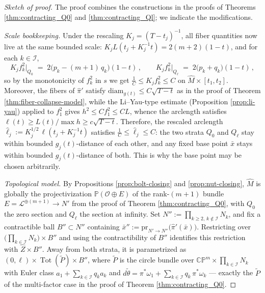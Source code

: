 \documentclass[11pt]{amsart}
\theoremstyle{plain}
\numberwithin{equation}{section}
\theoremstyle{definition}
\theoremstyle{remark}
\begin{document}
\begin{proof}[Sketch of proof]
The proof combines the constructions in the proofs of Theorems \ref{thm:contracting_Q0} and \ref{thm:contracting_Ql}; we indicate the modifications.

\emph{Scale bookkeeping.} Under the rescaling $K_j = (T-t_j)^{-1}$, all fiber quantities now live at the same bounded scale: $K_jL(t_j + K_j^{-1}t) = 2(m+2)(1-t)$, and for each $k \in \mathcal{I}$,
\[K_jf_k^2\big|_{Q_0} \;=\; 2\big(p_k - (m+1)\,q_k\big)(1-t)\,, \qquad K_jf_k^2\big|_{Q_\ell} \;=\; 2\big(p_k + q_k\big)(1-t)\,,\]
so by the monotonicity of $f_k^2$ in $s$ we get $\frac{1}{C} \leq K_jf_k^2 \leq C$ on $\widehat{M} \times [t_1,t_2]$. Moreover, the fibers of $\widehat{\pi}'$ satisfy $\mathrm{diam}_{g(t)} \leq C\sqrt{T-t}$ as in the proof of Theorem \ref{thm:fiber-collapse-model}, while the Li--Yau-type estimate (Proposition \ref{prop:li-yau}) applied to $f_1^2$ gives $h^2 \leq Cf_1^2 \leq CL$, whence the arclength satisfies $\ell(t) \geq L(t)/\max h \geq c\sqrt{T-t}$. Therefore, the rescaled arclength $\hat\ell_j := K_j^{1/2}\,\ell(t_j + K_j^{-1}t)$ satisfies $\frac{1}{C} \leq \hat\ell_j \leq C$: the two strata $Q_0$ and $Q_\ell$ stay within bounded $g_j(t)$-distance of each other, and any fixed base point $\bar{x}$ stays within bounded $g_j(t)$-distance of both. This is why the base point may be chosen arbitrarily.

\emph{Topological model.} By Propositions \ref{prop:bolt-closing} and \ref{prop:nut-closing}, $\widehat{M}$ is globally the projectivization $\mathbb{P}(\mathcal{O}\oplus E)$ of the rank-$(m+1)$ bundle $E = \mathcal{L}^{\oplus(m+1)} \to N'$ from the proof of Theorem \ref{thm:contracting_Q0}, with $Q_0$ the zero section and $Q_\ell$ the section at infinity. Set $N'' := \prod_{k \geq 2, \, k\not\in\mathcal{I}}N_k$, and fix a contractible ball $B'' \subset N''$ containing $\bar{x}'' := \mathrm{pr}_{N' \to N''}\big(\widehat{\pi}'(\bar{x})\big)$. Restricting over $\big(\prod_{k\in\mathcal{I}}N_k\big) \times B''$ and using the contractibility of $B''$ identifies this restriction with $\widehat{Z} \times B''$. Away from both strata, it is parametrized as $(0,\ell) \times \operatorname{Tot}(\widetilde{P}) \times B''$, where $\widetilde{P}$ is the circle bundle over $\mathbb{CP}^m \times \prod_{k\in\mathcal{I}}N_k$ with Euler class $a_1 + \sum_{k\in\mathcal{I}}q_ka_k$ and $d\widetilde\theta = \pi^*\omega_1 + \sum_{k\in\mathcal{I}}q_k\,\pi^*\omega_k$ --- exactly the $\widetilde{P}$ of the multi-factor case in the proof of Theorem \ref{thm:contracting_Q0}.


\end{proof}
\end{document}
